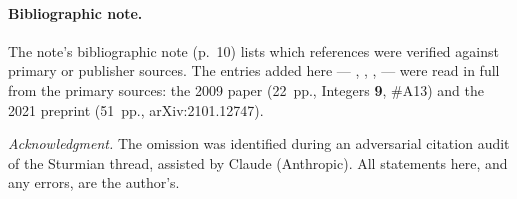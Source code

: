\documentclass[10pt]{article}
\begin{document}

\paragraph{Bibliographic note.} The note's bibliographic note (p.~10) lists which references were verified against primary or
publisher sources. The entries added here --- \cite{lopez2009conjugacy},
\cite{lopez2021periodicity}, \cite{bernstein1996conjugacy}, \cite{bernstein1994noniterative} ---
were read in full from the primary sources: the 2009 paper (22~pp., Integers \textbf{9}, \#A13)
and the 2021 preprint (51~pp., arXiv:2101.12747).

\medskip\noindent\emph{Acknowledgment.} The omission was identified during an adversarial citation audit of
the Sturmian thread, assisted by Claude (Anthropic). All statements here, and any errors, are the
author's.

\enlargethispage{3\baselineskip}
{\footnotesize


}
\end{document}
